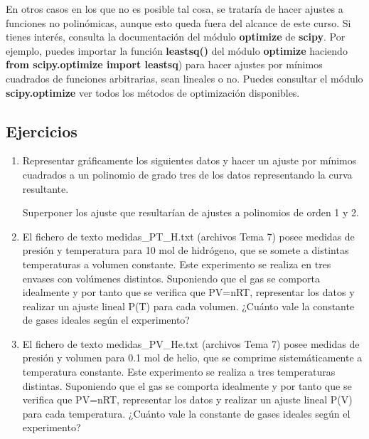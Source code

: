 \documentclass[letterpaper,10pt,spanish]{sphinxmanual}
\begin{document}
En otros casos en los que no es posible tal cosa, se trataría de hacer ajustes a funciones no polinómicas, aunque esto queda fuera del alcance de este curso. Si tienes interés, consulta la documentación del módulo \textbf{optimize} de \textbf{scipy}. Por ejemplo, puedes  importar la función \textbf{leastsq()} del módulo \textbf{optimize} haciendo \textbf{from scipy.optimize import leastsq}) para hacer ajustes por mínimos cuadrados de funciones arbitrarias, sean lineales o no. Puedes consultar el módulo \textbf{scipy.optimize} ver todos los métodos de optimización disponibles.


\subsection{Ejercicios}
\label{ajustes:ejercicios}\begin{enumerate}
\item {} 
Representar gráficamente los siguientes datos y hacer un ajuste por mínimos cuadrados a un polinomio de grado tres de los datos representando la curva resultante.
\begin{quote}


\end{quote}

Superponer los ajuste que resultarían de ajustes a polinomios de orden 1 y 2.

\item {} 
El fichero de texto medidas\_PT\_H.txt (archivos Tema 7) posee medidas de presión y temperatura para 10 mol de hidrógeno, que se somete a distintas temperaturas a volumen constante. Este experimento se realiza en tres envases con volúmenes distintos. Suponiendo que el gas se comporta idealmente y por tanto que se verifica que PV=nRT, representar los datos y realizar un ajuste lineal P(T) para cada volumen. ¿Cuánto vale la constante de gases ideales según el experimento?

\item {} 
El fichero de texto medidas\_PV\_He.txt (archivos Tema 7) posee medidas de presión y volumen para 0.1 mol de helio, que se comprime sistemáticamente a temperatura constante. Este experimento se realiza a tres temperaturas distintas. Suponiendo que el gas se comporta idealmente y por tanto que se verifica que PV=nRT, representar los datos y realizar un ajuste lineal P(V) para cada temperatura. ¿Cuánto vale la constante de gases ideales según el experimento?


\end{enumerate}
\end{document}
